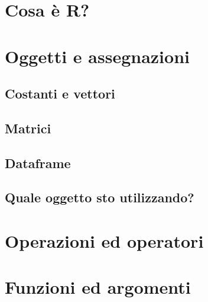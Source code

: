 \documentclass[a4paper,12pt,oneside]{book}
\begin{document}
\hypertarget{cosa-uxe8-r}{%
\section*{Cosa è R?}\label{cosa-uxe8-r}}

\hypertarget{oggetti-e-assegnazioni}{%
\section*{Oggetti e assegnazioni}\label{oggetti-e-assegnazioni}}

\hypertarget{costanti-e-vettori}{%
\subsection*{Costanti e vettori}\label{costanti-e-vettori}}

\hypertarget{matrici}{%
\subsection*{Matrici}\label{matrici}}

\hypertarget{dataframe}{%
\subsection*{Dataframe}\label{dataframe}}

\hypertarget{quale-oggetto-sto-utilizzando}{%
\subsection*{Quale oggetto sto utilizzando?}\label{quale-oggetto-sto-utilizzando}}

\hypertarget{operazioni-ed-operatori}{%
\section*{Operazioni ed operatori}\label{operazioni-ed-operatori}}

\hypertarget{funzioni-ed-argomenti}{%
\section*{Funzioni ed argomenti}\label{funzioni-ed-argomenti}}
\end{document}

